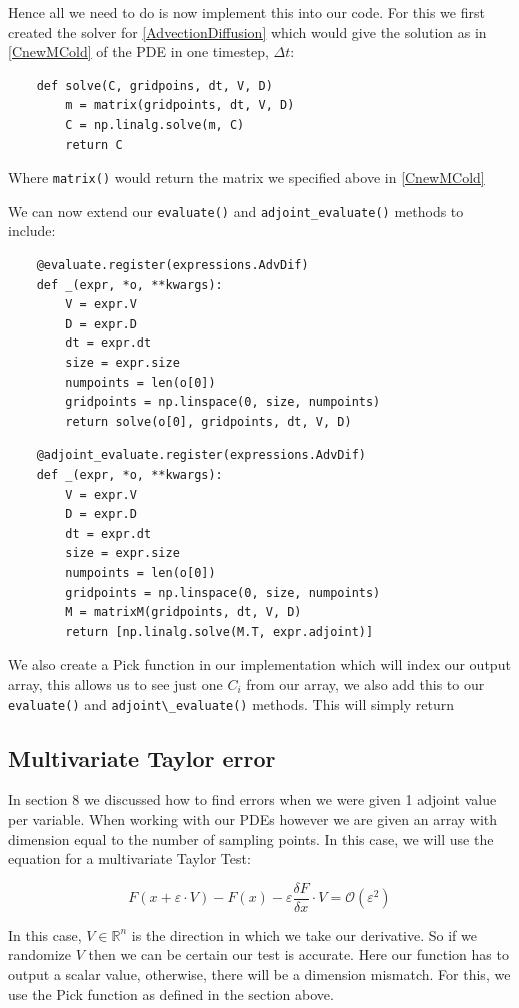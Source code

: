 \documentclass{article}
\begin{document}
Hence all we need to do is now implement this into our code. For this we first created the solver for \eqref{AdvectionDiffusion} which would give the solution as in \eqref{CnewMCold} of the PDE in one timestep, $\Delta t$:

\begin{verbatim}
    def solve(C, gridpoins, dt, V, D)
        m = matrix(gridpoints, dt, V, D)
        C = np.linalg.solve(m, C)
        return C
\end{verbatim}

Where \verb|matrix()| would return the matrix we specified above in \eqref{CnewMCold}

We can now extend our \verb|evaluate()| and \verb|adjoint_evaluate()| methods to include:

\begin{verbatim}
    @evaluate.register(expressions.AdvDif)
    def _(expr, *o, **kwargs):
        V = expr.V
        D = expr.D
        dt = expr.dt
        size = expr.size
        numpoints = len(o[0])
        gridpoints = np.linspace(0, size, numpoints)
        return solve(o[0], gridpoints, dt, V, D)
\end{verbatim}

\begin{verbatim}
    @adjoint_evaluate.register(expressions.AdvDif)
    def _(expr, *o, **kwargs):
        V = expr.V
        D = expr.D
        dt = expr.dt
        size = expr.size
        numpoints = len(o[0])
        gridpoints = np.linspace(0, size, numpoints)
        M = matrixM(gridpoints, dt, V, D)
        return [np.linalg.solve(M.T, expr.adjoint)]
\end{verbatim}

We also create a Pick function in our implementation which will index our output array, this allows us to see just one $C_i$ from our array, we also add this to our \verb|evaluate()| and \verb|adjoint\_evaluate()| methods. This will simply return 

\subsection{Multivariate Taylor error}

In section 8 we discussed how to find errors when we were given 1 adjoint value per variable. When working with our PDEs however we are given an array with dimension equal to the number of sampling points. In this case, we will use the equation for a multivariate Taylor Test:

\begin{equation}
    F(x + \varepsilon \cdot V) - F(x) - \varepsilon \frac{\delta F}{\delta x} \cdot V = \mathcal{O}(\varepsilon^2)
\end{equation}

In this case, $V \in \mathbb{R}^n$ is the direction in which we take our derivative. So if we randomize $V$ then we can be certain our test is accurate. Here our function has to output a scalar value, otherwise, there will be a dimension mismatch. For this, we use the Pick function as defined in the section above.




\end{document}
